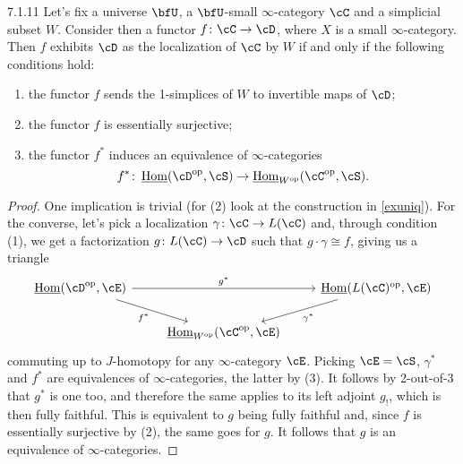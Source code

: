 \documentclass[a4paper,fontsize=12pt]{scrartcl}
\begin{document}
\begin{prop}
  7.1.11
  Let's fix a universe $\bfU$, a $\bfU$-small $\infty$-category $\cC$ and a
  simplicial subset $W$. Consider then a functor $f\colon\cC\rightarrow\cD$,
  where $X$ is a small $\infty$-category. Then $f$ exhibits $\cD$ as the
  localization of $\cC$ by $W$ if and only if the following conditions hold:
  \begin{enumerate}
    \item the functor $f$ sends the 1-simplices of $W$ to invertible maps of
      $\cD$;
    \item the functor $f$ is essentially surjective;
    \item the functor $f^*$ induces an equivalence of $\infty$-categories
      \[f^*\colon\Home(\cD^{\op},\cS)\rightarrow\Home_{W^{\op}}(\cC^{\op},\cS).\]
  \end{enumerate}
\end{prop}
\begin{proof}
  One implication is trivial (for (2) look at the construction in \ref{exuniq}).
  For the converse, let's pick a localization $\gamma\colon\cC\rightarrow
  L(\cC)$ and, through condition (1), we get a factorization $g\colon
  L(\cC)\rightarrow\cD$ such that $g\cdot\gamma\cong f$, giving us a triangle
  \[\begin{tikzcd}
    {\Home(\cD^{\op},\cE)} && {\Home(L(\cC)^{\op},\cE)} \\
                           & {\Home_{W^{\op}}(\cC^{\op},\cE)}
    \arrow["{g^*}", from=1-1, to=1-3]
    \arrow["{f^*}"', from=1-1, to=2-2]
    \arrow["{\gamma^*}", from=1-3, to=2-2]
  \end{tikzcd}\]
  commuting up to $J$-homotopy for any $\infty$-category $\cE$. Picking
  $\cE=\cS$, $\gamma^*$ and $f^*$ are equivalences
  of $\infty$-categories, the latter by (3). It follows by 2-out-of-3 that $g^*$
  is one too, and therefore the same applies to its left adjoint $g_!$, which is
  then fully faithful. This is equivalent to $g$ being fully faithful  and, since
  $f$ is essentially surjective by (2), the same goes for $g$. It follows that
  $g$ is an equivalence of $\infty$-categories.
\end{proof}
\end{document}
